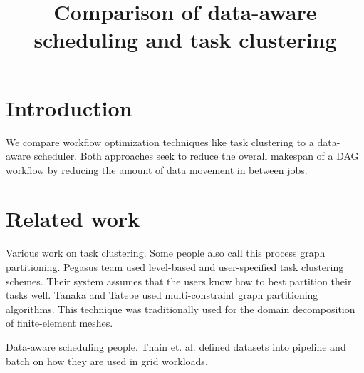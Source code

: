 \documentclass{article}
\title{Comparison of data-aware scheduling and task clustering}
\begin{document}
\section{Introduction} %
\label{sec:introduction}
We compare workflow optimization techniques like task clustering to a data-aware
scheduler.  Both approaches seek to reduce the overall makespan of a DAG
workflow by reducing the amount of data movement in between jobs.


\section{Related work} %
\label{sec:related_work}

Various work on task clustering.  Some people also call this process graph
partitioning.  Pegasus \cite{Singh2008} team used level-based and user-specified
task clustering schemes.  Their system assumes that the users know how to best
partition their tasks well.  Tanaka and Tatebe \cite{Tanaka2012} used
multi-constraint graph partitioning algorithms.  This technique was
traditionally used for the domain decomposition of finite-element meshes.

Data-aware scheduling people.  Thain et. al. \cite{Thain2003} defined datasets
into pipeline and batch on how they are used in grid workloads.  

\end{document}
